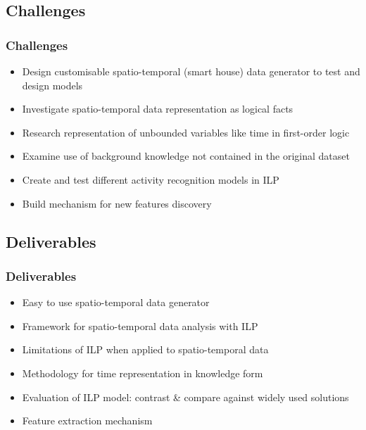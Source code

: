 \documentclass[09pt]{beamer}
\begin{document}
  \subsection{Challenges}
  \begin{frame}
    \frametitle{Challenges}
    \begin{itemize}
      \item \makebox[0pt][l]{$\square$}\raisebox{.15ex}{\hspace{0.1em}$\checkmark$} Design customisable spatio-temporal (smart house) data generator to test and design models
      \item \makebox[0pt][l]{$\square$}\raisebox{.15ex}{\hspace{0.1em}$\checkmark$} Investigate spatio-temporal data representation as logical facts
      \item \makebox[0pt][l]{$\square$}\raisebox{.15ex}{\hspace{0.1em}$\color{white}\checkmark$} Research representation of unbounded variables like time in first-order logic
      \item \makebox[0pt][l]{$\square$}\raisebox{.15ex}{\hspace{0.1em}$\color{white}\checkmark$} Examine use of background knowledge not contained in the original dataset
      \item \makebox[0pt][l]{$\square$}\raisebox{.15ex}{\hspace{0.1em}$\color{white}\checkmark$} Create and test different activity recognition models in ILP
      \item \makebox[0pt][l]{$\square$}\raisebox{.15ex}{\hspace{0.1em}$\color{white}\checkmark$} Build mechanism for new features discovery
    \end{itemize}
  \end{frame}

  \subsection{Deliverables}
  \begin{frame}%
    \frametitle{Deliverables}
    \begin{itemize}
      \item Easy to use spatio-temporal data generator
      \item Framework for spatio-temporal data analysis with ILP
      \item Limitations of ILP when applied to spatio-temporal data
      \item Methodology for time representation in knowledge form
      \item Evaluation of ILP model: contrast \& compare against widely used solutions
      \item Feature extraction mechanism
    \end{itemize}
  \end{frame}
\end{document}
